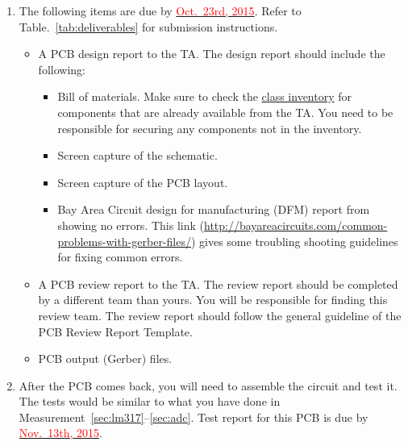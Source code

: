 \documentclass[letterpaper, 11pt]{article}
\newcommand{\due}[1]{\href{https://github.com/ucdart/UCD-EEC134/blob/master/support/schedule/eec134-schedule.pdf}{\textcolor{red}{#1}}}
\begin{document}
\begin{enumerate}
	\item The following items are due by \due{Oct.~23rd, 2015}. Refer to Table.~\ref{tab:deliverables} for submission instructions. 
		\begin{itemize}
			\item A PCB design report to the TA. The design report should include the following:
				\begin{itemize}
					\item Bill of materials. Make sure to check the \href{https://docs.google.com/spreadsheets/d/1GJnBLUymuVzXjrK0Zkdbc2lwTbw0z9a0JR4bLLzO-Sw/edit#gid=4}{class inventory} for components that are already available from the TA. You need to be responsible for securing any components not in the inventory. 
					\item Screen capture of the schematic.
					\item Screen capture of the PCB layout.
					\item Bay Area Circuit design for manufacturing (DFM) report from showing no errors. This link (\url{http://bayareacircuits.com/common-problems-with-gerber-files/}) gives some troubling shooting guidelines for fixing common errors. 
				\end{itemize}
			\item A PCB review report to the TA. The review report should be completed by a different team than yours. You will be responsible for finding this review team. The review report should follow the general guideline of the PCB Review Report Template.

			\item PCB output (Gerber) files.
		\end{itemize}

	\item After the PCB comes back, you will need to assemble the circuit and test it. The tests would be similar to what you have done in Measurement~\ref{sec:lm317}--\ref{sec:adc}. Test report for this PCB is due by \due{Nov.~13th, 2015}.
\end{enumerate}


%
%
\end{document}
